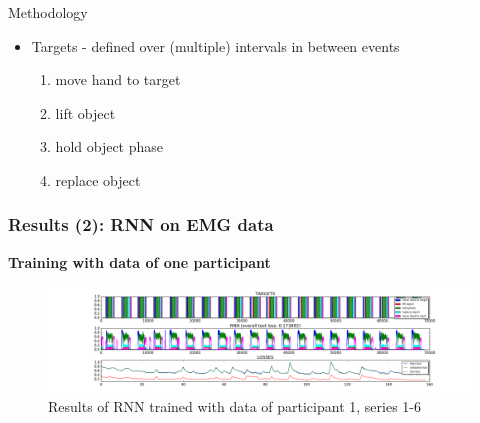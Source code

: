 \documentclass{beamer}
\begin{document}
\begin{frame}{Methodology}
{\begin{itemize}
                    \item Targets - defined over (multiple) intervals in between events
                    \begin{enumerate}
                    \item move hand to target
                        \item lift object
                        \item hold object phase
                        \item replace object
                    \end{enumerate}

                \end{itemize}

        }
\end{frame}



		

\begin{frame}
	\frametitle{Results (2): RNN on EMG data}
	\textbf{Training with data of one participant}
	\begin{figure}[ht]
		\centering
		\includegraphics[width=1.0\textwidth,trim={5cm 0cm 5cm 0cm},clip]{images/EMG-results_participant_1_series1-6.png}
		\caption{Results of RNN trained with data of participant 1, series 1-6}
	\end{figure}
\end{frame}
\end{document}
